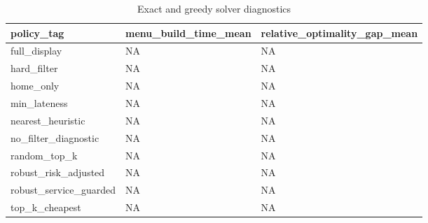 \begin{table}[ht]
\centering
\begin{tabular}{lll}
 \hline
policy\_tag & menu\_build\_time\_mean & relative\_optimality\_gap\_mean \\
 \hline
full\_display & NA & NA \\
hard\_filter & NA & NA \\
home\_only & NA & NA \\
min\_lateness & NA & NA \\
nearest\_heuristic & NA & NA \\
no\_filter\_diagnostic & NA & NA \\
random\_top\_k & NA & NA \\
robust\_risk\_adjusted & NA & NA \\
robust\_service\_guarded & NA & NA \\
top\_k\_cheapest & NA & NA \\
 \hline
\end{tabular}
\caption{Exact and greedy solver diagnostics}
\end{table}
